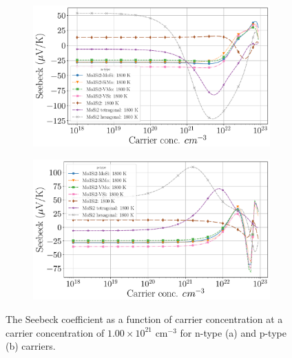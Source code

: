 \documentclass[7.5pt]{article}
\theoremstyle{plain}
\theoremstyle{definition}
\newcommand{\<}{\langle}
\renewcommand{\>}{\rangle}
\begin{document}
\begin{figure}[b!]
\centering
\begin{subfigure}{.5\textwidth}
  \centering
  \includegraphics[width=\linewidth]{allmats_S_doping_temp_n}
  \caption{}
  \label{fig:sub1}
\end{subfigure}%
\begin{subfigure}{.5\textwidth}
  \centering
  \includegraphics[width=\linewidth]{allmats_S_doping_temp_p}
  \caption{}
  \label{fig:sub2}
\end{subfigure}
\caption{The Seebeck coefficient as a function of carrier concentration at a carrier concentration of $1.00 \times 10^{21}$ cm$^{-3}$ for n-type (a) and p-type (b) carriers.}
\label{fig:S-Doping}
\end{figure}
\end{document}
